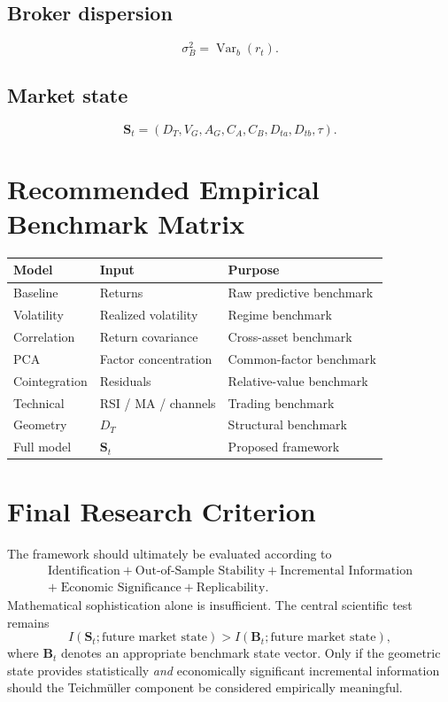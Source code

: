 \documentclass[11pt,a4paper]{article}
\numberwithin{equation}{section}
\newcommand{\Var}{\operatorname{Var}}
\begin{document}
\subsection*{Broker dispersion}
\[
\sigma_B^2=\Var_b(r_t).
\]

\subsection*{Market state}
\[
\mathbf{S}_t=
\left(D_T,V_G,A_G,C_A,C_B,D_{ta},D_{tb},\tau\right).
\]

\section{Recommended Empirical Benchmark Matrix}

\begin{center}
\begin{tabular}{lll}
\toprule
Model & Input & Purpose\\
\midrule
Baseline & Returns & Raw predictive benchmark\\
Volatility & Realized volatility & Regime benchmark\\
Correlation & Return covariance & Cross-asset benchmark\\
PCA & Factor concentration & Common-factor benchmark\\
Cointegration & Residuals & Relative-value benchmark\\
Technical & RSI / MA / channels & Trading benchmark\\
Geometry & $D_T$ & Structural benchmark\\
Full model & $\mathbf{S}_t$ & Proposed framework\\
\bottomrule
\end{tabular}
\end{center}

\section{Final Research Criterion}

The framework should ultimately be evaluated according to
\[
\boxed{
\begin{gathered}
\text{Identification}+\text{Out-of-Sample Stability}
+\text{Incremental Information}\\
+\;\text{Economic Significance}+\text{Replicability}.
\end{gathered}
}
\]
Mathematical sophistication alone is insufficient. The central
scientific test remains
\begin{equation}
I\left(\mathbf{S}_t;\text{future market state}\right)
>
I\left(\mathbf{B}_t;\text{future market state}\right),
\end{equation}
where $\mathbf{B}_t$ denotes an appropriate benchmark state vector.
Only if the geometric state provides statistically \emph{and}
economically significant incremental information should the
Teichmüller component be considered empirically meaningful.
\end{document}
